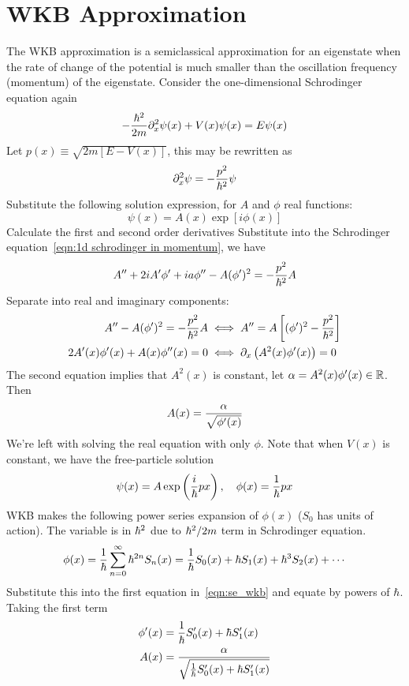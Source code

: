 \section{WKB Approximation}
The WKB approximation is a semiclassical approximation 
for an eigenstate when the rate of change of the potential 
is much smaller than the oscillation frequency (momentum) of the eigenstate. 
Consider the one-dimensional Schrodinger equation again 
\[ 
    -\dfrac {\hbar^2}{2m}\partial_{x}^2 \psi(x) + V(x)\psi(x) = E\psi(x)
\] 
Let $p(x)\equiv \sqrt{2m[E-V(x)]}$, this may be rewritten as 
\begin{equation}\label{eqn:1d schrodinger in momentum}
    \partial_{x}^2\psi = -\dfrac{p^2}{\hbar^2}\psi
\end{equation}
Substitute the following solution expression, for $A$ and $\phi$ real functions:
\[
    \psi(x) = A(x) \exp[i\phi(x)]
\] 
Calculate the first and second order derivatives 
Substitute into the Schrodinger equation~\ref{eqn:1d schrodinger in momentum}, 
we have 
\[ 
    A'' + 2iA'\phi' + ia\phi'' - A(\phi')^2 = -\dfrac{p^2}{\hbar^2}A
\] 
Separate into real and imaginary components:
\begin{equation}\begin{aligned}\label{eqn:se_wkb}
    A'' - A(\phi')^2 = -\dfrac{p^2}{\hbar^2} A &\iff A'' = A\left[(\phi')^2 - \dfrac{p^2}{\hbar^2}\right]  \\ 
    2A'(x)\phi'(x) + A(x)\phi''(x) = 0 &\iff \partial_{x} \left(A^2(x)\phi'(x)\right) = 0
\end{aligned}\end{equation}
The second equation implies that $A^2(x)$ is constant, let $\alpha = A^2(x)\phi'(x)\in \mathbb R$. Then 
\[ 
    A(x) = \dfrac{\alpha}{\sqrt{\phi'(x)}}
\] 
We're left with solving the real equation with only $\phi$. 
Note that when $V(x)$ is constant, we have the free-particle solution 
\[ 
    \psi(x) = A\exp\left(\dfrac i {\hbar} p x\right), \quad \phi(x) = \dfrac 1 {\hbar} p x
\] 
WKB makes the following power series expansion of $\phi(x)$ ($S_0$ has units of action). 
The variable is in $\hbar^2$ due to $\hbar^2/2m$ term in Schrodinger equation. 
\[ 
    \phi(x) = \dfrac 1 {\hbar} \sum_{n=0}^\infty \hbar^{2n}S_n(x) = \dfrac 1 {\hbar} S_0(x) 
    + \hbar S_1(x) + \hbar^3 S_2(x)+\cdots
\] 
Substitute this into the first equation in~\ref{eqn:se_wkb} and equate by powers of $\hbar$. 
Taking the first term 
\[\begin{aligned} 
    \phi'(x) &= \dfrac 1 {\hbar} S_0'(x) + \hbar S'_1(x) \\ 
    A(x) &= \dfrac {\alpha}{\sqrt{\frac 1 {\hbar} S'_0(x) + \hbar S'_1(x)}}
\end{aligned}\] 
